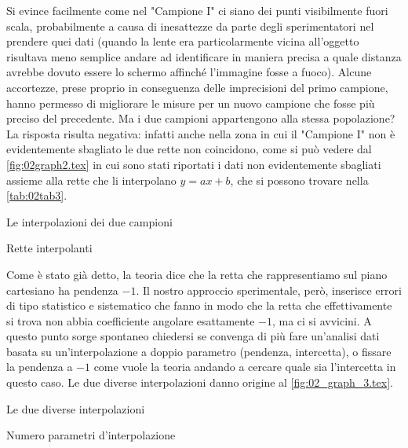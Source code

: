 Si evince facilmente come nel "Campione I" ci siano dei punti visibilmente fuori scala, probabilmente a causa di
 inesattezze da parte degli sperimentatori nel prendere quei dati (quando la lente era particolarmente vicina all'oggetto risultava
 meno semplice andare ad identificare in maniera precisa a quale distanza avrebbe dovuto essere lo schermo affinché l'immagine
 fosse a fuoco). Alcune accortezze, prese proprio in conseguenza delle imprecisioni del primo campione, hanno permesso di migliorare
 le misure per un nuovo campione che fosse più preciso del precedente. Ma i due campioni appartengono alla stessa popolazione? La risposta
 risulta negativa: infatti anche nella zona in cui il "Campione I" non è evidentemente sbagliato le due rette non coincidono,
 come si può vedere dal \autoref{fig:02graph2.tex} in cui sono stati riportati i dati non evidentemente sbagliati assieme alla rette
 che li
 interpolano $y = ax + b$, che si possono trovare nella \autoref{tab:02tab3}.
\begin{grafico} \centering  \caption{Le interpolazioni dei due campioni} \label{fig:02graph2.tex} \end{grafico}
\begin{tabella}
	\centering
	
	\caption{Rette interpolanti}
	\label{tab:02tab3}
\end{tabella}

Come è stato già detto, la teoria dice che la retta che rappresentiamo sul piano cartesiano ha pendenza $-1$. Il nostro approccio
 sperimentale, però, inserisce errori di tipo statistico e sistematico che fanno in modo che la retta che effettivamente si trova
 non abbia coefficiente angolare esattamente $-1$, ma ci si avvicini. A questo punto sorge spontaneo chiedersi se convenga di più fare
 un'analisi dati basata su un'interpolazione a doppio parametro (pendenza, intercetta), o fissare la pendenza a $-1$ come vuole la
 teoria andando a cercare quale sia l'intercetta in questo caso. Le due diverse interpolazioni danno origine al
 \autoref{fig:02_graph_3.tex}.
\begin{grafico} \centering  \caption{Le due diverse interpolazioni} \label{fig:02_graph_3.tex} \end{grafico}
\begin{tabella}
	\centering
	
	\caption{Numero parametri d'interpolazione}
	\label{tab:02tab4}
\end{tabella}

